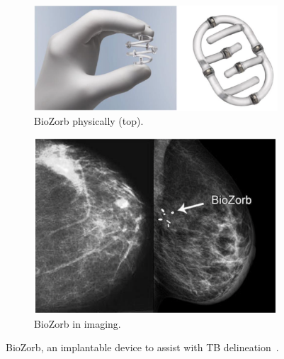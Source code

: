 \begin{figure}[h!]
        \begin{minipage}{0.92\textwidth}
                \centering
                \begin{subfigure}[b]{0.9\textwidth}
                        \centering
                        \includegraphics[width=\textwidth]{../figs/introduction/BioZorb_physically.png}
                        \caption{BioZorb physically (top).}
                        \label{fig:introduction:biozorb_physically}
                \end{subfigure}

                \vspace{1em} %

                \begin{subfigure}[b]{0.9\textwidth}
                        \centering
                        \includegraphics[width=\textwidth]{../figs/introduction/BioZorb_in_imaging.png}
                        \caption{BioZorb in imaging.}
                        \label{fig:introduction:biozorb_in_imaging}
                \end{subfigure}
        \end{minipage}
        \caption{BioZorb, an implantable device to assist with TB delineation~\cite{RefWorks:RefID:370-einsteinisaac}.}
        \label{fig:introduction:biozorb_implant}
\end{figure}

